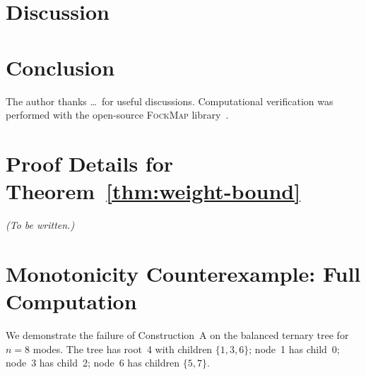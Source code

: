 \documentclass[aps,pra,twocolumn,superscriptaddress,showpacs]{revtex4-2}
\theoremstyle{definition}
\begin{document}
\section{Discussion}
\label{sec:discussion}


\section{Conclusion}
\label{sec:conclusion}


\begin{acknowledgments}
The author thanks \ldots\ for useful discussions.
Computational verification was performed with the open-source
\textsc{FockMap} library~\cite{fockmap2026}.
\end{acknowledgments}



\appendix

\section{Proof Details for Theorem~\ref{thm:weight-bound}}
\label{app:weight-proof}
\textit{(To be written.)}

\section{Monotonicity Counterexample: Full Computation}
\label{app:monotonicity-counterexample}

We demonstrate the failure of Construction~A on the balanced ternary
tree for $n = 8$ modes.  The tree has root~4 with children $\{1, 3, 6\}$;
node~1 has child~0; node~3 has child~2; node~6 has children $\{5, 7\}$.
\end{document}
